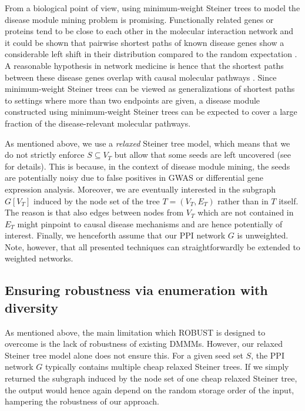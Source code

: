 \documentclass{bioinfo}
\begin{document}
From a biological point of view, using minimum-weight Steiner trees to model the disease module mining problem is promising. Functionally related genes or proteins tend to be close to each other in the molecular interaction network and it could be shown that pairwise shortest paths of known disease genes show a considerable left shift in their distribution compared to the random expectation \citep{Menche2015-bp}. A reasonable hypothesis in network medicine is hence that the shortest paths between these disease genes overlap with causal molecular pathways \citep{Barabasi2011-yb}. Since minimum-weight Steiner trees can be viewed as generalizations of shortest paths to settings where more than two endpoints are given, a disease module constructed using minimum-weight Steiner trees can be expected to cover a large fraction of the disease-relevant molecular pathways. %

As mentioned above, we use a \emph{relaxed} Steiner tree model, which means that we do not strictly enforce $S\subseteq V_T$ but allow that some seeds are left uncovered (see  for details). This is because, in the context of disease module mining, the seeds are potentially noisy due to false positives in GWAS or differential gene expression analysis. Moreover, we are eventually interested in the subgraph $G[V_T]$ induced by the node set of the tree $T=(V_T,E_T)$ rather than in $T$ itself. The reason is that also edges between nodes from $V_T$ which are not contained in $E_T$ might pinpoint to causal disease mechanisms and are hence potentially of interest. Finally, we henceforth assume that our PPI network $G$ is unweighted. Note, however, that all presented techniques can straightforwardly be extended to weighted networks. 

\subsection{Ensuring robustness via enumeration with diversity}

As mentioned above, the main limitation which ROBUST is designed to overcome is the lack of robustness of existing DMMMs. However, our relaxed Steiner tree model alone does not ensure this. For a given seed set $S$, the PPI network $G$ typically contains multiple cheap relaxed Steiner trees. If we simply returned the subgraph induced by the node set of one cheap relaxed Steiner tree, the output would hence again depend on the random storage order of the input, hampering the robustness of our approach.
\end{document}
